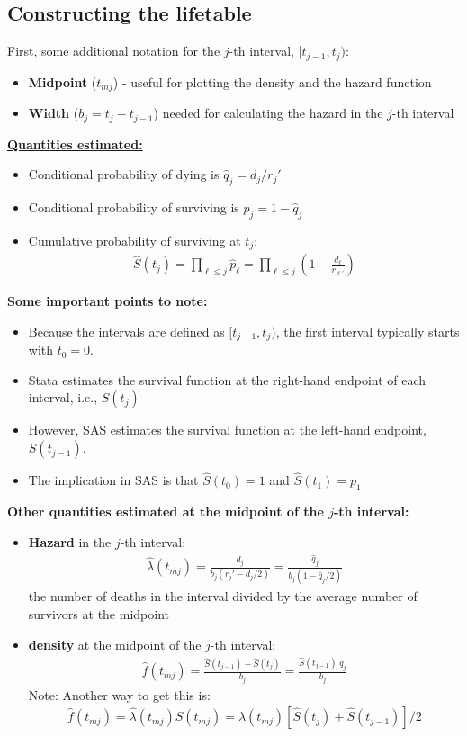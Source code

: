 \documentclass[11pt,slidesonly,semrot,portrait,palatino]{book}
\begin{document}
\subsection{Constructing the lifetable}
First, some additional notation for the $j$-th interval,
$[t_{j-1},t_{j})$:
\begin{itemize}
\item {\bf Midpoint} ($t_{mj}$) - useful for plotting the density and the
hazard function
\item  {\bf Width} ($b_j =  t_{j} - t_{j-1}$) needed for calculating
the hazard in the $j$-th interval
\end{itemize}
\underline{\bf Quantities estimated:}
\begin{itemize}
\item  Conditional probability of dying is $\hat{q}_j = d_j/r_j'$
\item  Conditional probability of surviving is $\hat{p}_j = 1 - \hat{q}_j$
\item  Cumulative probability of surviving at $t_j$:
\begin{eqnarray*}
\hat{S}(t_j) = \prod_{\ell \le j} \hat{p}_{\ell} = \prod_{\ell \le j} \left( 1 - \frac{d_{\ell}}{r_{\ell'}}\right)
\end{eqnarray*}
\end{itemize}
{\bf Some important points to note:}
\begin{itemize}
\item Because the intervals are defined as $[t_{j-1},t_{j})$, the
first interval typically starts with $t_0=0$.
\item Stata estimates the survival function at the right-hand
endpoint of each interval, i.e., $S(t_j)$
\item However, SAS estimates
the survival function at the left-hand endpoint, $S(t_{j-1})$.
\item The implication in SAS is that
$\hat{S}(t_0)=1$ and $\hat{S}(t_1)=p_1$
\end{itemize}
{\bf Other quantities estimated at the midpoint of the $j$-th interval:}
\begin{itemize}
\item  {\bf Hazard} in the $j$-th interval:
\begin{eqnarray*}
\hat{\lambda}(t_{mj}) =  \frac{d_j}{b_j (r_j' - d_j/2)} = \frac{\hat{q}_j}{b_j (1- \hat{q}_j/2)}
\end{eqnarray*}
the number of deaths in the interval divided by the
average number of survivors at the midpoint
\item {\bf density} at the midpoint of the  $j$-th interval:
\begin{eqnarray*}
\hat{f}(t_{mj}) =  \frac{\hat{S}(t_{j-1}) - \hat{S}(t_j)}{b_j} = \frac{\hat{S}(t_{j-1}) \; \hat{q}_j}{b_j}
\end{eqnarray*}
Note:  Another way to get this is:
\begin{eqnarray*}
\hat{f}(t_{mj})  =   \hat{\lambda}(t_{mj}) \hat{S}(t_{mj}) = \hat{\lambda}(t_{mj}) [\hat{S}(t_j)+ \hat{S}(t_{j-1})]/2
\end{eqnarray*}
\end{itemize}
\end{document}
